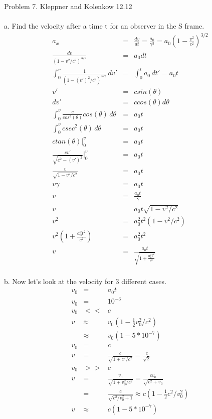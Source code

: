 \documentclass[11pt]{amsart}
\begin{document}
Problem 7. Kleppner and Kolenkow 12.12 \\ \\
a. Find the velocity after a time t for an observer in the S frame. \\
\begin{eqnarray*} 
a_{x} &=& \frac{dv}{dt} =\frac{a_{0}}{\gamma^{3}} = a_{0}(1-\frac{v^{2}}{c^{2}})^{3/2} \\
\frac{dv}{(1-v^{2}/c^{2})^{3/2}} &=& a_{0}dt \\
\int_{0}^{v}\frac{1}{(1-(v')^{2}/c^{2})^{3/2}}\,dv' &=& \int_{0}^{t}a_{0}\,dt' = a_{0}t \\
v' &=& csin(\theta) \\
dv' &=& ccos(\theta)d\theta \\
\int_{0}^{v}\frac{c}{cos^{3}(\theta)}cos(\theta)\,d\theta &=& a_{0}t \\
\int_{0}^{v}csec^{2}(\theta)\,d\theta &=& a_{0}t \\
ctan(\theta)|_{0}^{v} &=& a_{0}t \\
\frac{cv'}{\sqrt{c^{2}-(v')^{2}}}|_{0}^{v} &=& a_{0}t \\
\frac{v}{\sqrt{1-v^{2}/c^{2}}} &=& a_{0}t \\
v\gamma&=& a_{0}t \\
v &=& \frac{a_{0}t}{\gamma} \\
v &=& a_{0}t\sqrt{1-v^{2}/c^{2}} \\
v^{2} &=& a_{0}^{2}t^{2}(1-v^{2}/c^{2}) \\
v^{2}(1+\frac{a_{0}^{2}t^{2}}{c^{2}}) &=& a_{0}^{2}t^{2} \\
v &=& \frac{a_{0}t}{\sqrt{1+\frac{a_{0}^{2}t^{2}}{c^{2}}}} 
\end{eqnarray*} \\
b. Now let's look at the velocity for 3 different cases. \\
\begin{eqnarray*}
v_{0} &=& a_{0}t \\
v_{0} &=& 10^{-3} \\
v_{0} &<<& c \\
v &\approx& v_{0}(1-\frac{1}{2}v_{0}^{2}/c^{2}) \\
&\approx& v_{0}(1-5*10^{-7}) \\
v_{0} &=& c \\
v &=& \frac{c}{\sqrt{1+c^{2}/c^{2}}} = \frac{c}{\sqrt{2}} \\
v_{0} &>>& c \\
v &=& \frac{v_{0}}{\sqrt{1+v_{0}^{2}/c^{2}}} = \frac{cv_{0}}{\sqrt{c^{2}+v_{0}}} \\
&=& \frac{c}{\sqrt{c^{2}/v_{0}^{2}+1}} \approx c(1-\frac{1}{2}c^{2}/v_{0}^{2}) \\
v &\approx& c(1-5*10^{-7}) 
\end{eqnarray*} \\
\end{document}
